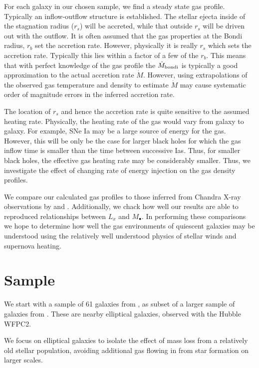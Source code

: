 \documentclass[usenatbib,fleqn]{mn2e}
\newcommand{\Mdot}{\dot{M}}
\newcommand{\Mdotb}{\dot{M}_{\rm bondi}}
\newcommand{\rs}{r_s}
\newcommand{\rb}{r_b}
\newcommand{\Mbh}[1][]{M_{\bullet#1}}
\begin{document}
For each galaxy in our chosen sample, we find a steady state gas profile. Typically an inflow-outflow structure is established. The stellar ejecta inside of the stagnation radius ($\rs$) will be accreted, while that outside $\rs$ will be driven out with the outflow.  It is often assumed that the gas properties at the Bondi radius, $\rb$ set the accretion rate. However, physically it is really $\rs$ which sets the accretion rate. Typically this lies within a factor of a few of the $\rb$.  This means that with perfect knowledge of the gas profile the $\Mdotb$ is typically a good approximation to the actual accretion rate $\Mdot$.  However, using extrapolations of the observed gas temperature and density to estimate $\Mdot$ may cause systematic order of magnitude errors in the inferred  accretion rate. 

The location of $\rs$ and hence the accretion rate is  quite sensitive to the assumed heating rate.  Physically, the heating rate of the gas would vary from galaxy to galaxy. For example, SNe Ia may be a large source of energy for the gas. However, this will be only be the case for larger black holes for which the gas inflow time is smaller than the time between successive Ias. Thus, for smaller black holes, the effective gas heating rate may be considerably smaller. Thus, we investigate the effect of changing rate of energy injection on the gas density profiles. 

We compare our calculated gas profiles to those inferred from Chandra X-ray observations by \citealt{AllenDunn+:2006a} and \citealt{RussellMcNamara+:2013a}. Additionally, we chack how well our results are able to reproduced relationships between $L_x$ and $\Mbh$. In performing these comparisons we hope to determine how well the gas environments of quiescent galaxies may be understood using the relatively well understood physics of stellar winds and supernova heating.


\section{Sample}
We start with a sample of 61 galaxies from , as subset of a larger sample of galaxies from \citealt{FaberTremaine+:1997a}. These are nearby elliptical galaxies, observed with the Hubble WFPC2.

We focus on elliptical galaxies to isolate the effect of mass loss from a relatively old stellar population, avoiding additional gas flowing in from star formation on larger scales. 
\end{document}

